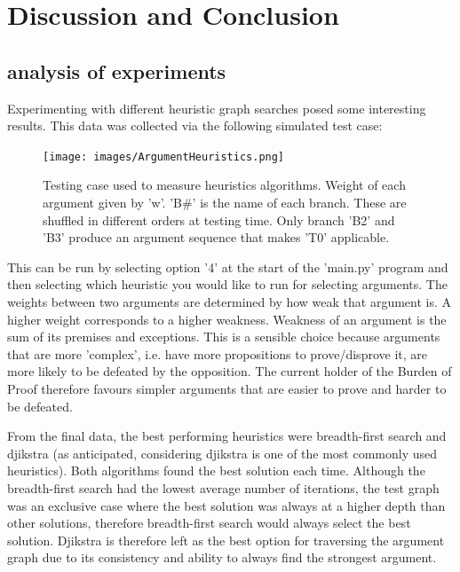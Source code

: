 \documentclass[10pt,a4paper,twocolumn]{article}
\begin{document}
\clearpage{}

\section{Discussion and Conclusion}

\subsection{analysis of experiments}
Experimenting with different heuristic graph searches posed some interesting
results. This data was collected via the following simulated test case:

\begin{figure}[h!]
	\label{ArgumentHeuristics}
	\texttt{[image: images/ArgumentHeuristics.png]}
	\centering
	\caption{Testing case used to measure heuristics algorithms. Weight of each
	argument given by 'w'. 'B\#' is the name of each branch. These are shuffled
	in different orders at testing time. Only branch 'B2' and 'B3' produce an
argument sequence that makes 'T0' applicable.}
\end{figure}
This can be run by selecting option '4' at the start of the 'main.py'
program and then selecting which heuristic you would like to run for selecting
arguments. The weights between two arguments are determined by how weak that
argument is. A higher weight corresponds to a higher weakness. Weakness of an
argument is the sum of its premises and exceptions. This is a sensible choice
because arguments that are more 'complex', i.e. have more propositions to
prove/disprove it, are more likely to be defeated by the opposition. The current
holder of the Burden of Proof therefore favours simpler arguments that are
easier to prove and harder to be defeated.

From the final data, the best performing heuristics were
breadth-first search and djikstra (as anticipated, considering djikstra is one of
the most commonly used heuristics). Both algorithms found the
best solution each time. Although the breadth-first search had the lowest
average number of iterations, the test graph was an exclusive case where
the best solution was always at a higher depth than other solutions, therefore
breadth-first search would always select the best solution.
Djikstra is therefore left as the best option for traversing the
argument graph due to its consistency and ability to always find the strongest
argument.
\end{document}
